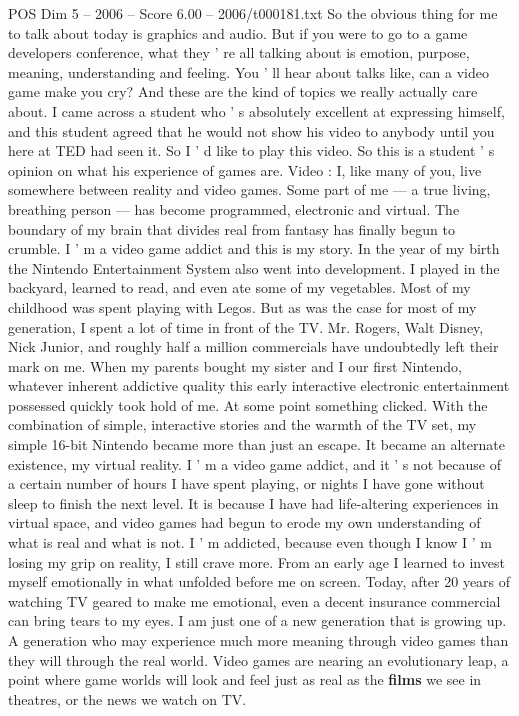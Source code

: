 \begin{textsample}{POS Dim 5 – 2006 – Score 6.00 – 2006/t000181.txt}
So the obvious thing for me to talk about today is graphics and audio.
But if you were to go to a game developers conference, what they ' re all talking about is emotion, purpose, meaning, understanding and feeling.
You ' ll hear about talks like, can a video game make you cry?
And these are the kind of topics we really actually care about.
I came across a student who ' s absolutely excellent at expressing himself, and this student agreed that he would not show his video to anybody until you here at TED had seen it.
So I ' d like to play this video.
So this is a student ' s opinion on what his experience of games are.
Video : I, like many of you, live somewhere between reality and video games.
Some part of me — a true living, breathing person — has become programmed, electronic and virtual.
The boundary of my brain that divides real from fantasy has finally begun to crumble.
I ' m a video game addict and this is my story.
In the year of my birth the Nintendo Entertainment System also went into development.
I played in the backyard, learned to read, and even ate some of my vegetables.
Most of my childhood was spent playing with Legos.
But as was the case for most of my generation, I spent a lot of time in front of the TV.
Mr.
Rogers, Walt Disney, Nick Junior, and roughly half a million commercials have undoubtedly left their mark on me.
When my parents bought my sister and I our first Nintendo, whatever inherent addictive quality this early interactive electronic entertainment possessed quickly took hold of me.
At some point something clicked.
With the combination of simple, interactive stories and the warmth of the TV set, my simple 16-bit Nintendo became more than just an escape.
It became an alternate existence, my virtual reality.
I ' m a video game addict, and it ' s not because of a certain number of hours I have spent playing, or nights I have gone without sleep to finish the next level.
It is because I have had life-altering experiences in virtual space, and video games had begun to erode my own understanding of what is real and what is not.
I ' m addicted, because even though I know I ' m losing my grip on reality, I still crave more.
From an early age I learned to invest myself emotionally in what unfolded before me on screen.
Today, after 20 years of watching TV geared to make me emotional, even a decent insurance commercial can bring tears to my eyes.
I am just one of a new generation that is growing up.
A generation who may experience much more meaning through video games than they will through the real world.
Video games are nearing an evolutionary leap, a point where game worlds will look and feel just as real as the \textbf{films} we see in theatres, or the news we watch on TV.

\end{textsample}
